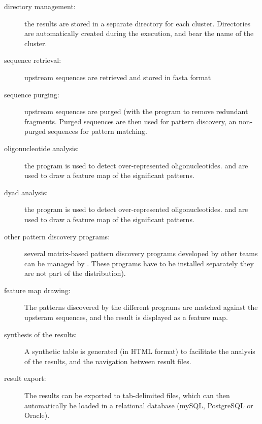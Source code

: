 \begin{description}
\item[directory management:] the results are stored in a separate
directory for each cluster. Directories are automatically created
during the execution, and bear the name of the cluster.

\item[sequence retrieval:] upstream sequences are retrieved and stored
in fasta format

\item[sequence purging:] upstream sequences are purged (with the
  program  to remove redundant
  fragments. Purged sequences are then used for pattern discovery, an
  non-purged sequences for pattern matching.

\item[oligonucleotide analysis:] the program 
  is used to detect over-represented
  oligonucleotides.  and 
  are used to draw a feature map of the significant patterns.

\item[dyad analysis:] the program  is used to
  detect over-represented oligonucleotides.  and
   are used to draw a feature map of the
  significant patterns.

\item[other pattern discovery programs:] several matrix-based pattern
discovery programs developed by other teams can be managed by 
. These programs have to be installed 
separately they are not part of the \RSAT distribution). 

\item[feature map drawing:] The patterns discovered by the different 
programs are matched against the  upsteram sequences, and the result 
is displayed as a feature map.

\item[synthesis of the results:] A synthetic table is generated (in HTML
  format) to facilitate the analysis of the results, and the
  navigation between result files.

\item[result export:] The results can be exported to tab-delimited
  files, which can then automatically be loaded in a relational
  database (mySQL, PostgreSQL or Oracle).

\end{description}


